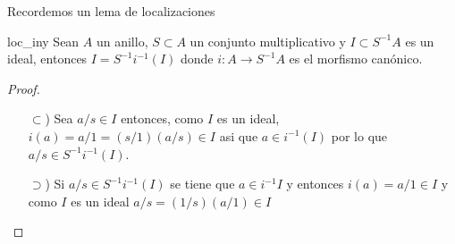 \documentclass[14pt]{extarticle}
\begin{document}
Recordemos un lema de localizaciones

\begin{lema}{}{loc_iny}
    Sean $A$ un anillo, $S\subset A$ un conjunto multiplicativo
    y $I\subset S^{-1}A$ es un ideal, entonces
    $I= S^{-1}i^{-1}(I)$ donde
    $i:A\rightarrow S^{-1}A$ es el morfismo canónico.
\end{lema}
\begin{proof}
    \begin{enumerate}
        \item[$\subset$)] Sea $a/s\in I$ entonces, como $I$ es un ideal, 
        $i(a)=a/1=(s/1)(a/s)\in I$ asi que $a\in i^{-1}(I)$
        por lo que $a/s\in S^{-1}i^{-1}(I)$.
        \item[$\supset$)]Si $a/s\in S^{-1}i^{-1}(I)$ se 
        tiene que $a\in i^{-1}I$ y entonces $i(a)=a/1\in I$ 
        y como $I$ es un ideal $a/s=(1/s)(a/1)\in I$
    \end{enumerate}
\end{proof}
\end{document}
